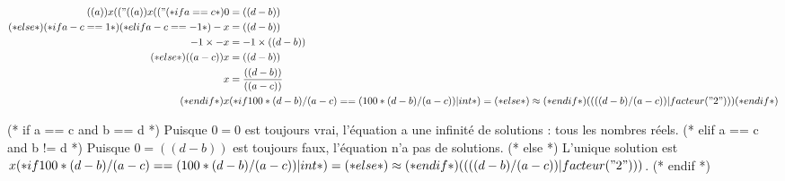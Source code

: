 \exercice*

\begin{align*}
  (( a )) x (( "%
  (( a )) x (( "%
  (* if a == c *)
    0 &= (( d - b )) \\
  (* else *)
    (* if a - c == 1 *)
    (* elif a - c == -1 *)
      -x &= (( d - b )) \\
      -1 \times -x &= -1 \times (( d - b )) \\
    (* else *)
      (( a - c )) x &= (( d - b )) \\
      x &= \frac{(( d - b ))}{(( a - c ))} \\
    (* endif *)
    x &
         (* if 100*(d-b)/(a-c) == (100*(d-b)/(a-c))|int *)
             =
         (* else *)
             \approx
         (* endif *)
         (( ((d-b)/(a-c)) | facteur("2") ))
  (* endif *)
\end{align*}

(* if a == c and b == d *)
  Puisque $0=0$ est toujours vrai, l'équation a une infinité de solutions : tous les nombres réels.
(* elif a == c and b != d *)
  Puisque $0=((d - b))$ est toujours faux, l'équation n'a pas de solutions.
(* else *)
  L'unique solution est
  $x
  (* if 100*(d-b)/(a-c) == (100*(d-b)/(a-c))|int *)
      =
  (* else *)
      \approx
  (* endif *)
  (( ((d-b)/(a-c)) | facteur("2") ))$.
(* endif *)
